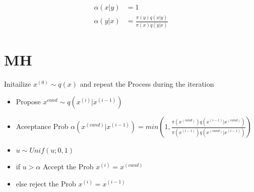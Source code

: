 \documentclass[11pt]{article}
\begin{document}
\begin{align*}
\alpha(x|y) &= 1 \\
\alpha(y|x) &= \frac{\pi(y)  q(x|y)}{\pi(x)q(y|x)}
\end{align*}

\section{MH}
Initailize $x^{(0)} \sim q(x)$ and repeat the Process during the iteration
\begin{itemize}
	\item Propose $x^{cand} \sim q(x^{(i)}| x^{(i-1)})$
	\item Aceeptance Prob $\alpha(x^{(cand)}| x^{(i-1)}) = min(1, \frac{\pi(x^{(cand)})  q(x^{(i-1)}|x^{(cand)})}{\pi(x^{(i-1)}) q(x^{(cand)}|x^{(i-1)})})$
	\item $u \sim Unif(u ; 0,1)$
	\item if $ u > \alpha $ Accept the Prob $x^{(i)} = x^{(cand)}$
	\item else reject the Prob $x^{(i)} = x^{(i-1)}$
\end{itemize}
\end{document}
